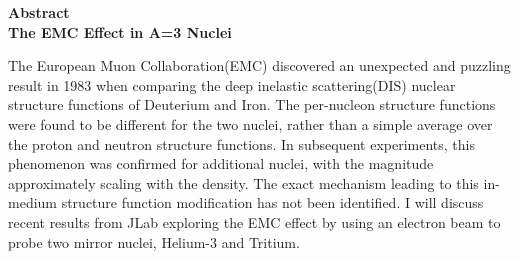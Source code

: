 \begin{center}
	{\large \textbf{Abstract}}\\
	
	{\large \textbf{The EMC Effect in A=3 Nuclei}}\\
\end{center}

The European Muon Collaboration(EMC) discovered an unexpected and puzzling result in 1983 when comparing the deep inelastic scattering(DIS) nuclear structure functions of Deuterium and Iron. The per-nucleon structure functions were found to be different for the two nuclei, rather than a simple average over the proton and neutron structure functions.  In subsequent experiments, this phenomenon was confirmed for additional nuclei, with the magnitude approximately scaling with the density.  The exact mechanism leading to this in-medium structure function modification has not been identified.  I will discuss recent results from JLab exploring the EMC effect by using an electron beam to probe two mirror nuclei, Helium-3 and Tritium. 
